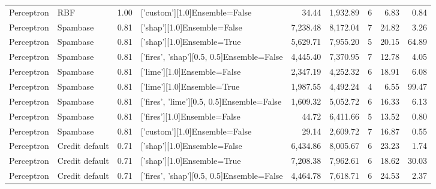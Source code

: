 \begin{tabular}{llrlrrlrr}
         Perceptron &            RBF &      1.00 &             ['custom'][1.0]Ensemble=False &      34.44 &                 1,932.89 &               6 &               6.83 &   0.84 \\
         Perceptron &       Spambase &      0.81 &               ['shap'][1.0]Ensemble=False &   7,238.48 &                 8,172.04 &               7 &              24.82 &   3.26 \\
         Perceptron &       Spambase &      0.81 &                ['shap'][1.0]Ensemble=True &   5,629.71 &                 7,955.20 &               5 &              20.15 &  64.89 \\
         Perceptron &       Spambase &      0.81 & ['fires', 'shap'][0.5, 0.5]Ensemble=False &   4,445.40 &                 7,370.95 &               7 &              12.78 &   4.05 \\
         Perceptron &       Spambase &      0.81 &               ['lime'][1.0]Ensemble=False &   2,347.19 &                 4,252.32 &               6 &              18.91 &   6.08 \\
         Perceptron &       Spambase &      0.81 &                ['lime'][1.0]Ensemble=True &   1,987.55 &                 4,492.24 &               4 &               6.55 &  99.47 \\
         Perceptron &       Spambase &      0.81 & ['fires', 'lime'][0.5, 0.5]Ensemble=False &   1,609.32 &                 5,052.72 &               6 &              16.33 &   6.13 \\
         Perceptron &       Spambase &      0.81 &              ['fires'][1.0]Ensemble=False &      44.72 &                 6,411.66 &               5 &              13.52 &   0.80 \\
         Perceptron &       Spambase &      0.81 &             ['custom'][1.0]Ensemble=False &      29.14 &                 2,609.72 &               7 &              16.87 &   0.55 \\
         Perceptron & Credit default &      0.71 &               ['shap'][1.0]Ensemble=False &   6,434.86 &                 8,005.67 &               6 &              23.23 &   1.74 \\
         Perceptron & Credit default &      0.71 &                ['shap'][1.0]Ensemble=True &   7,208.38 &                 7,962.61 &               6 &              18.62 &  30.03 \\
         Perceptron & Credit default &      0.71 & ['fires', 'shap'][0.5, 0.5]Ensemble=False &   4,464.78 &                 7,618.71 &               6 &              24.53 &   2.37 \\

\end{tabular}
